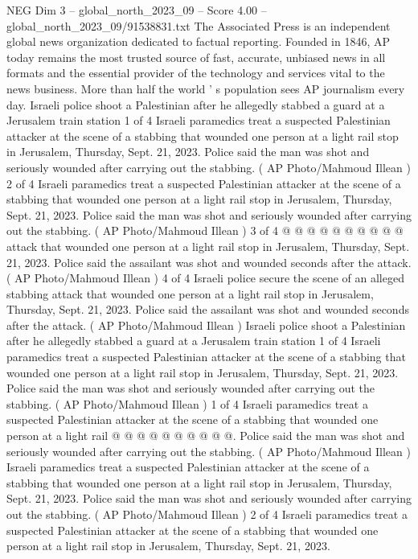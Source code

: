 \begin{textsample}{NEG Dim 3 – global\_north\_2023\_09 – Score 4.00 – global\_north\_2023\_09/91538831.txt}  \label{ex:f3_neg_417}
The Associated Press is an independent global news organization dedicated to factual reporting.
Founded in 1846, AP today remains the most trusted source of fast, accurate, unbiased news in all formats and the essential provider of the technology and services vital to the news business.
More than half the world ' s population sees AP journalism every day.
Israeli police shoot a Palestinian after he allegedly stabbed a guard at a Jerusalem train station 1 of 4 Israeli paramedics treat a suspected Palestinian attacker at the scene of a stabbing that wounded one person at a light rail stop in Jerusalem, Thursday, Sept. 21, 2023.
Police said the man was shot and seriously wounded after carrying out the stabbing. ( AP Photo/Mahmoud Illean ) 2 of 4 Israeli paramedics treat a suspected Palestinian attacker at the scene of a stabbing that wounded one person at a light rail stop in Jerusalem, Thursday, Sept. 21, 2023.
Police said the man was shot and seriously wounded after carrying out the stabbing. ( AP Photo/Mahmoud Illean ) 3 of 4 @ @ @ @ @ @ @ @ @ @ attack that wounded one person at a light rail stop in Jerusalem, Thursday, Sept. 21, 2023.
Police said the assailant was shot and wounded seconds after the attack. ( AP Photo/Mahmoud Illean ) 4 of 4 Israeli police secure the scene of an alleged stabbing attack that wounded one person at a light rail stop in Jerusalem, Thursday, Sept. 21, 2023.
Police said the assailant was shot and wounded seconds after the attack. ( AP Photo/Mahmoud Illean ) Israeli police shoot a Palestinian after he allegedly stabbed a guard at a Jerusalem train station 1 of 4 Israeli paramedics treat a suspected Palestinian attacker at the scene of a stabbing that wounded one person at a light rail stop in Jerusalem, Thursday, Sept. 21, 2023.
Police said the man was shot and seriously wounded after carrying out the stabbing. ( AP Photo/Mahmoud Illean ) 1 of 4 Israeli paramedics treat a suspected Palestinian attacker at the scene of a stabbing that wounded one person at a light rail @ @ @ @ @ @ @ @ @ @.
Police said the man was shot and seriously wounded after carrying out the stabbing. ( AP Photo/Mahmoud Illean ) Israeli paramedics treat a suspected Palestinian attacker at the scene of a stabbing that wounded one person at a light rail stop in Jerusalem, Thursday, Sept. 21, 2023.
Police said the man was shot and seriously wounded after carrying out the stabbing. ( AP Photo/Mahmoud Illean ) 2 of 4 Israeli paramedics treat a suspected Palestinian attacker at the scene of a stabbing that wounded one person at a light rail stop in Jerusalem, Thursday, Sept. 21, 2023.

\end{textsample}

